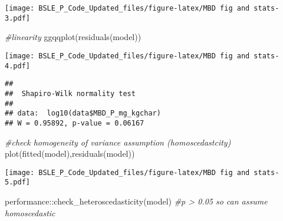 \documentclass[
]{article}
\newenvironment{Shaded}{\begin{snugshade}}{\end{snugshade}}
\newcommand{\CommentTok}[1]{\textcolor[rgb]{0.56,0.35,0.01}{\textit{#1}}}
\newcommand{\FunctionTok}[1]{\textcolor[rgb]{0.00,0.00,0.00}{#1}}
\newcommand{\NormalTok}[1]{#1}
\newcommand{\SpecialCharTok}[1]{\textcolor[rgb]{0.00,0.00,0.00}{#1}}
\begin{document}
\begin{Shaded}
\end{Shaded}

\texttt{[image: BSLE\_P\_Code\_Updated\_files/figure-latex/MBD fig and stats-3.pdf]}

\begin{Shaded}
\begin{Highlighting}[]
\CommentTok{\#linearity}
\FunctionTok{ggqqplot}\NormalTok{(}\FunctionTok{residuals}\NormalTok{(model))}
\end{Highlighting}
\end{Shaded}

\texttt{[image: BSLE\_P\_Code\_Updated\_files/figure-latex/MBD fig and stats-4.pdf]}

\begin{Shaded}
\end{Shaded}

\begin{verbatim}
## 
##  Shapiro-Wilk normality test
## 
## data:  log10(data$MBD_P_mg_kgchar)
## W = 0.95892, p-value = 0.06167
\end{verbatim}

\begin{Shaded}
\begin{Highlighting}[]
\CommentTok{\#check homogeneity of variance assumption (homoscedastcity)}
\FunctionTok{plot}\NormalTok{(}\FunctionTok{fitted}\NormalTok{(model),}\FunctionTok{residuals}\NormalTok{(model))}
\end{Highlighting}
\end{Shaded}

\texttt{[image: BSLE\_P\_Code\_Updated\_files/figure-latex/MBD fig and stats-5.pdf]}

\begin{Shaded}
\begin{Highlighting}[]
\NormalTok{performance}\SpecialCharTok{::}\FunctionTok{check\_heteroscedasticity}\NormalTok{(model) }\CommentTok{\#p \textgreater{} 0.05 so can assume homoscedastic}
\end{Highlighting}
\end{Shaded}
\end{document}
